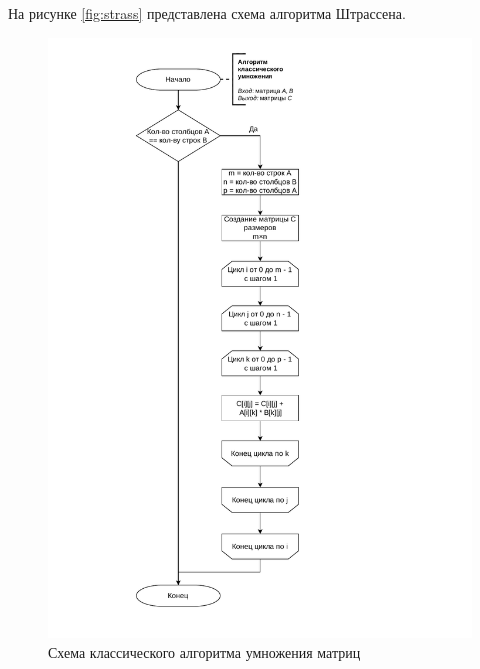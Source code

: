 На рисунке \ref{fig:strass} представлена схема алгоритма Штрассена.

\begin{figure}[h]
	\centering
	\includegraphics[height=0.7\textheight, page=1]{algo-scheme.pdf}
	\caption{Схема классического алгоритма умножения матриц}
	\label{fig:classic}
\end{figure}

\clearpage

